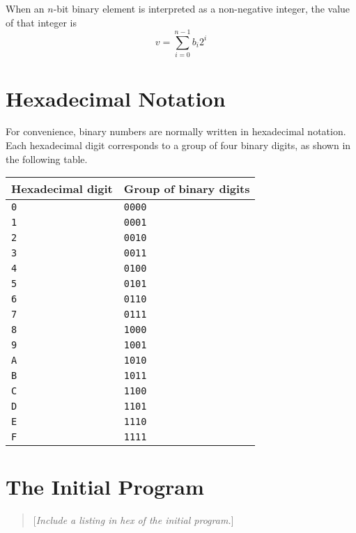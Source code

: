 \documentclass[a4paper,12pt]{article}
\newcommand{\num}[1]{\texttt{#1}\xspace}
\newcommand{\comment}[1]{\begin{quote}[\textit{#1}]\end{quote}}
\begin{document}
When an $n$-bit binary element is interpreted as a non-negative integer, the value of that integer is
\[
    v = \sum_{i=0}^{n-1} b_{i}2^{i}
\]

\section{Hexadecimal Notation}
\label{sec:hexadecimal-notation}

For convenience, binary numbers are normally written in hexadecimal notation.
Each hexadecimal digit corresponds to a group of four binary digits, as shown in the following table.

\begin{center}
  \begin{tabular}{@{}ll@{}}
    \hline
    Hexadecimal digit & Group of binary digits \\
    \hline
    \num{0}           & \num{0000}   \\
    \num{1}           & \num{0001}   \\
    \num{2}           & \num{0010}   \\
    \num{3}           & \num{0011}   \\
    \num{4}           & \num{0100}   \\
    \num{5}           & \num{0101}   \\
    \num{6}           & \num{0110}   \\
    \num{7}           & \num{0111}   \\
    \num{8}           & \num{1000}   \\
    \num{9}           & \num{1001}   \\
    \num{A}           & \num{1010}   \\
    \num{B}           & \num{1011}   \\
    \num{C}           & \num{1100}   \\
    \num{D}           & \num{1101}   \\
    \num{E}           & \num{1110}   \\
    \num{F}           & \num{1111}   \\
    \hline
  \end{tabular}
\end{center}

\section{The Initial Program}
\label{sec:initial-program}

\comment{Include a listing in hex of the initial program.}
\end{document}
